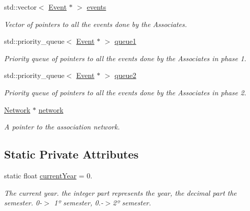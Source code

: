 \begin{DoxyCompactItemize}
std\+::vector$<$ \mbox{\hyperlink{classEvent}{Event}} $\ast$ $>$ \mbox{\hyperlink{classAssociation_aaf2b66c89b34895285a108658336df51}{events}}
\begin{DoxyCompactList}\small\item\em Vector of pointers to all the events done by the Associates. \end{DoxyCompactList}\item 
std\+::priority\+\_\+queue$<$ \mbox{\hyperlink{classEvent}{Event}} $\ast$ $>$ \mbox{\hyperlink{classAssociation_a22ce7b1ee683ccc41ac9aa2864744349}{queue1}}
\begin{DoxyCompactList}\small\item\em Priority queue of pointers to all the events done by the Associates in phase 1. \end{DoxyCompactList}\item 
std\+::priority\+\_\+queue$<$ \mbox{\hyperlink{classEvent}{Event}} $\ast$ $>$ \mbox{\hyperlink{classAssociation_ab67c6667f1fda8a6c97e7a7f2c79be2f}{queue2}}
\begin{DoxyCompactList}\small\item\em Priority queue of pointers to all the events done by the Associates in phase 2. \end{DoxyCompactList}\item 
\mbox{\hyperlink{classNetwork}{Network}} $\ast$ \mbox{\hyperlink{classAssociation_a6747cedd4ce14a3b890c8ac87f676192}{network}}
\begin{DoxyCompactList}\small\item\em A pointer to the association network. \end{DoxyCompactList}\end{DoxyCompactItemize}
\subsection*{Static Private Attributes}
\begin{DoxyCompactItemize}
\item 
static float \mbox{\hyperlink{classAssociation_a38c0785b12a067ee6c295a2d3ee453da}{current\+Year}} = 0.
\begin{DoxyCompactList}\small\item\em The current year. the integer part represents the year, the decimal part the semester. 0-\/$>$ 1º semester, 0.-\/$>$2º semester. \end{DoxyCompactList}\end{DoxyCompactItemize}


